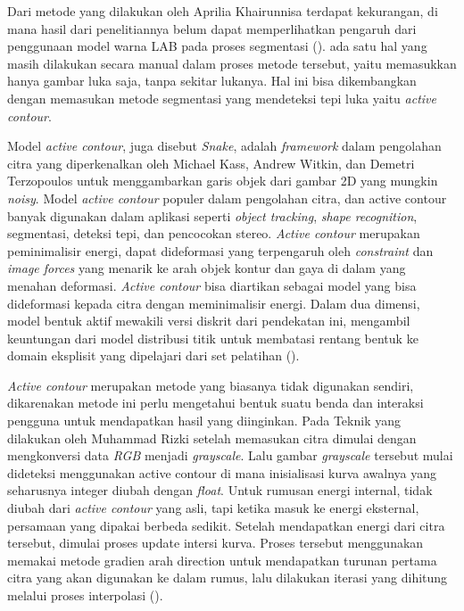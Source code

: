 Dari metode yang dilakukan oleh Aprilia Khairunnisa terdapat 
kekurangan, di mana hasil dari penelitiannya belum dapat 
memperlihatkan pengaruh dari penggunaan model warna LAB pada 
proses segmentasi (\cite{Aprilia}). ada satu hal yang masih 
dilakukan secara manual dalam proses metode tersebut, yaitu 
memasukkan hanya gambar luka saja, tanpa sekitar lukanya. 
Hal ini bisa dikembangkan dengan memasukan metode 
segmentasi yang mendeteksi tepi luka yaitu 
\textit{active contour}. 

Model \textit{active contour}, juga disebut \textit{Snake}, 
adalah \textit{framework} dalam pengolahan citra yang 
diperkenalkan oleh Michael Kass, Andrew Witkin, dan Demetri 
Terzopoulos untuk menggambarkan garis objek dari gambar 2D 
yang mungkin \textit{noisy}. Model \textit{active contour} 
populer dalam pengolahan citra, dan active contour banyak 
digunakan dalam aplikasi seperti \textit{object tracking}, 
\textit{shape recognition}, segmentasi, deteksi tepi, dan 
pencocokan stereo. \textit{Active contour} merupakan 
peminimalisir energi, dapat dideformasi yang terpengaruh 
oleh \textit{constraint} dan \textit{image forces} yang 
menarik ke arah objek kontur dan gaya di dalam yang menahan 
deformasi. \textit{Active contour} bisa diartikan sebagai 
model yang bisa dideformasi kepada citra dengan 
meminimalisir energi. Dalam dua dimensi, model bentuk aktif 
mewakili versi diskrit dari pendekatan ini, mengambil 
keuntungan dari model distribusi titik untuk membatasi 
rentang bentuk ke domain eksplisit yang dipelajari dari set 
pelatihan (\cite{kass}).

\emph{Active contour} merupakan metode yang biasanya tidak 
digunakan sendiri, dikarenakan metode ini perlu mengetahui 
bentuk suatu benda dan interaksi pengguna untuk mendapatkan 
hasil yang diinginkan. Pada Teknik yang dilakukan oleh 
Muhammad Rizki setelah memasukan citra dimulai dengan 
mengkonversi data \textit{RGB} menjadi \textit{grayscale}. 
Lalu gambar \textit{grayscale} tersebut mulai dideteksi 
menggunakan active contour di mana inisialisasi kurva 
awalnya yang seharusnya integer diubah dengan 
\textit{float}. Untuk rumusan energi internal, tidak diubah 
dari \textit{active contour} yang asli, tapi ketika masuk 
ke energi eksternal, persamaan yang dipakai berbeda sedikit. 
Setelah mendapatkan energi dari citra tersebut, dimulai 
proses update intersi kurva. Proses tersebut menggunakan 
memakai metode gradien arah direction untuk mendapatkan 
turunan pertama citra yang akan digunakan ke dalam rumus, 
lalu dilakukan iterasi yang dihitung melalui proses 
interpolasi (\cite{MRizki}).

